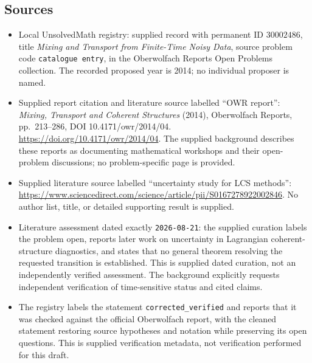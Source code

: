 \documentclass[11pt]{article}
\begin{document}
\subsection{Sources}
\begin{itemize}
\item Local UnsolvedMath registry: supplied record with permanent ID \(30002486\), title \emph{Mixing and Transport from Finite-Time Noisy Data}, source problem code \texttt{catalogue entry}, in the Oberwolfach Reports Open Problems collection. The recorded proposed year is 2014; no individual proposer is named.
\item Supplied report citation and literature source labelled ``OWR report'': \emph{Mixing, Transport and Coherent Structures} (2014), Oberwolfach Reports, pp.\ 213--286, DOI 10.4171/owr/2014/04. \url{https://doi.org/10.4171/owr/2014/04}. The supplied background describes these reports as documenting mathematical workshops and their open-problem discussions; no problem-specific page is provided.
\item Supplied literature source labelled ``uncertainty study for LCS methods'': \url{https://www.sciencedirect.com/science/article/pii/S0167278922002846}. No author list, title, or detailed supporting result is supplied.
\item Literature assessment dated exactly \texttt{2026-08-21}: the supplied curation labels the problem open, reports later work on uncertainty in Lagrangian coherent-structure diagnostics, and states that no general theorem resolving the requested transition is established. This is supplied dated curation, not an independently verified assessment. The background explicitly requests independent verification of time-sensitive status and cited claims.
\item The registry labels the statement \texttt{corrected\_verified} and reports that it was checked against the official Oberwolfach report, with the cleaned statement restoring source hypotheses and notation while preserving its open questions. This is supplied verification metadata, not verification performed for this draft.
\end{itemize}
\end{document}

